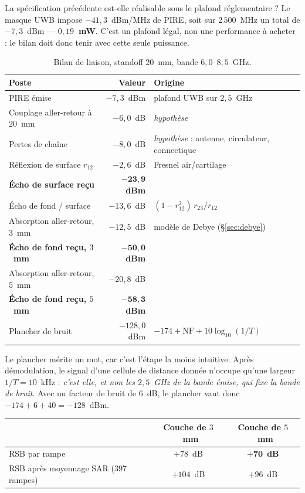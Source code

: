 \documentclass[11pt,a4paper]{article}
\begin{document}
La spécification précédente est-elle réalisable sous le plafond réglementaire ?
Le masque UWB impose $-41{,}3$~dBm/MHz de PIRE, soit sur $2\,500$~MHz un total
de $-7{,}3$~dBm --- \textbf{$0{,}19$~mW}. C'est un plafond légal, non une
performance à acheter : le bilan doit donc tenir avec cette seule puissance.

\begin{table}[h]
\centering
\caption{Bilan de liaison, standoff $20$~mm, bande $6{,}0$--$8{,}5$~GHz.}
\begin{tabular}{lrl}
\toprule
Poste & Valeur & Origine \\
\midrule
PIRE émise & $-7{,}3$~dBm & plafond UWB sur $2{,}5$~GHz \\
Couplage aller-retour à $20$~mm & $-6{,}0$~dB & \emph{hypothèse} \\
Pertes de chaîne & $-8{,}0$~dB & \emph{hypothèse} : antenne,
  circulateur, connectique \\
Réflexion de surface $r_{12}$ & $-2{,}6$~dB & Fresnel air/cartilage \\
\midrule
\textbf{Écho de surface reçu} & $\mathbf{-23{,}9}$~\textbf{dBm} & \\
\midrule
Écho de fond / surface & $-13{,}6$~dB & $(1-r_{12}^2)\,r_{23}/r_{12}$ \\
Absorption aller-retour, $3$~mm & $-12{,}5$~dB & modèle de Debye
  (\S\ref{sec:debye}) \\
\textbf{Écho de fond reçu, $3$~mm} & $\mathbf{-50{,}0}$~\textbf{dBm} & \\
Absorption aller-retour, $5$~mm & $-20{,}8$~dB & \\
\textbf{Écho de fond reçu, $5$~mm} & $\mathbf{-58{,}3}$~\textbf{dBm} & \\
\midrule
Plancher de bruit & $-128{,}0$~dBm
  & $-174 + \mathrm{NF} + 10\log_{10}(1/T)$ \\
\bottomrule
\end{tabular}
\end{table}

Le plancher mérite un mot, car c'est l'étape la moins intuitive. Après
démodulation, le signal d'une cellule de distance donnée n'occupe qu'une
largeur $1/T = 10$~kHz : \emph{c'est elle, et non les $2{,}5$~GHz de la bande
émise, qui fixe la bande de bruit}. Avec un facteur de bruit de $6$~dB, le
plancher vaut donc $-174 + 6 + 40 = -128$~dBm.

\begin{table}[h]
\centering
\begin{tabular}{lcc}
\toprule
& Couche de $3$~mm & Couche de $5$~mm \\
\midrule
RSB par rampe & $+78$~dB & $\mathbf{+70}$~\textbf{dB} \\
RSB après moyennage SAR ($397$ rampes) & $+104$~dB & $+96$~dB \\
\bottomrule
\end{tabular}
\end{table}
\end{document}
